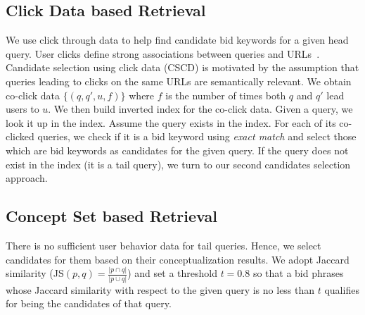 \subsection{Click Data based Retrieval}
\label{sec:CSCD}
We use click through data to help find candidate bid keywords for a given
head query.  User clicks define strong associations between queries
and URLs~\cite{fuxman:keywordgeneration}.  Candidate selection using
click data (CSCD) is motivated by the assumption that queries leading
to clicks on the same URLs are semantically relevant.  We obtain
co-click data $\{(q,q',u,f)\}$ where $f$ is the number of times both
$q$ and $q'$ lead users to $u$.
We then build inverted index for the co-click data.  Given a query, we look it up in the index.  Assume the query exists in the index. For each of its co-clicked queries, we check if it is a bid
keyword using {\it exact match} and select those which are bid
keywords as candidates for the given query. If the query does not exist in the
index (it is a tail query), we turn to our second candidates selection
approach.
\subsection{Concept Set based Retrieval}
\label{sec:CSJS}
There is no sufficient user behavior data for tail queries. Hence, we
select candidates for them based on their conceptualization results. 
We adopt Jaccard similarity
(JS$(p,q)=\frac{\vert{}p\cap{}q\vert{}}{\vert{}p\cup{}q\vert{}}$) and
set a threshold $t=0.8$ 
so that a bid phrases whose Jaccard
similarity with respect to the given query is no less
than $t$ qualifies for being the candidates of that query.



